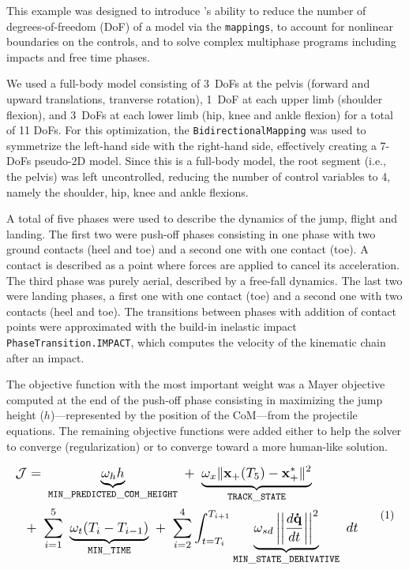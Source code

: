 This example was designed to introduce \bioptim's ability to reduce the number of degrees-of-freedom (DoF) of a model via the \texttt{mappings}, to account for nonlinear boundaries on the controls, and to solve complex multiphase programs including impacts and free time phases.

We used a full-body model consisting of 3~DoFs at the pelvis (forward and upward translations, tranverse rotation), 1~DoF at each upper limb (shoulder flexion), and 3~DoFs at each lower limb (hip, knee and ankle flexion) for a total of 11 DoFs.
For this optimization, the \texttt{BidirectionalMapping} was used to symmetrize the left-hand side with the right-hand side, effectively creating a 7-DoFs pseudo-2D model. 
Since this is a full-body model, the root segment (i.e., the pelvis) was left uncontrolled, reducing the number of control variables to 4, namely the shoulder, hip, knee and ankle flexions. 

A total of five phases were used to describe the dynamics of the jump, flight and landing. 
The first two were push-off phases consisting in one phase with two ground contacts (heel and toe) and a second one with one contact (toe). 
A contact is described as a point where forces are applied to cancel its acceleration. 
The third phase was purely aerial, described by a free-fall dynamics.
The last two were landing phases, a first one with one contact (toe) and a second one with two contacts (heel and toe).
The transitions between phases with addition of contact points were approximated with the build-in inelastic impact \texttt{PhaseTransition.IMPACT}, which computes the velocity of the kinematic chain after an impact.

The objective function with the most important weight was a Mayer objective computed at the end of the push-off phase consisting in maximizing the jump height ($h$)---represented by the position of the CoM---from the projectile equations.
The remaining objective functions were added either to help the solver to converge (regularization) or to converge toward a more human-like solution. 

\[ 
\resizebox{0.90\columnwidth}{!}{$ 
\begin{aligned}
\mathcal{J} = &~\underbrace{\omega_h h}_{\mathtt{MIN\_PREDICTED\_COM\_HEIGHT}}~+~\underbrace{\omega_{x} \| \mathbf{x}_+(T_5) - \mathbf{x}_+^*\|^2}_{\mathtt{TRACK\_STATE}}\\
+~&\sum^5_{i=1}~\underbrace{\omega_{t}(T_i - T_{i-1})}_{\mathtt{MIN\_TIME}}~
  +~\sum_{i=2}^4\int_{t=T_i}^{T_{i+1}}\underbrace{\omega_{sd}\left|\left|\frac{d\mathbf{\dot{q}}}{dt}\right|\right|^2}_{\mathtt{MIN\_STATE\_DERIVATIVE}}~dt
\end{aligned}  
$} 
\addtag  
\label{eq:cost_jumper}
\]

